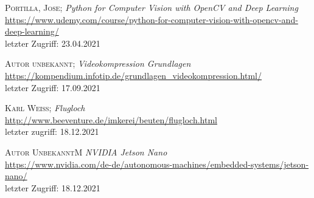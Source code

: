 \documentclass[11pt,a4paper]{article}
\newcommand{\bibLabel}[1]{\label{#1}\hypertarget{#1}{}}
\begin{document}
\begin{thebibliography}
 \bibLabel{udemy}
	\textsc{Portilla, Jose};
	\textit{Python for Computer Vision with OpenCV and Deep Learning}\\
	\url{https://www.udemy.com/course/python-for-computer-vision-with-opencv-and-deep-learning/}\\
	letzter Zugriff: 23.04.2021

 \bibLabel{compression}
	\textsc{Autor unbekannt};
	\textit{Videokompression Grundlagen}\\
	\url{https://kompendium.infotip.de/grundlagen_videokompression.html/}\\
	letzter Zugriff: 17.09.2021

 \bibLabel{flugloch}
    \textsc{Karl Weiß};
    \textit{Flugloch}\\
    \url{http://www.beeventure.de/imkerei/beuten/flugloch.html}\\
    letzter zugriff: 18.12.2021

 \bibLabel{jetson-nano}
    \textsc{Autor Unbekannt}M
    \textit{NVIDIA Jetson Nano}\\
    \url{https://www.nvidia.com/de-de/autonomous-machines/embedded-systems/jetson-nano/}\\
    letzter Zugriff: 18.12.2021

\end{thebibliography}
\end{document}
